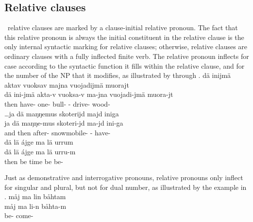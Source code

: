 \subsection{Relative clauses}\label{relativeClauses}
\PS\ relative clauses are marked by a clause-initial relative pronoun. The fact that this relative pronoun  
is always the initial constituent in the relative clause is the only internal syntactic marking for relative clauses; otherwise, relative clauses are ordinary clauses with a fully inflected finite verb. %
The relative pronoun %
inflects for case according to the syntactic function it fills within the relative clause, and for the number of the NP that it modifies, as illustrated by  through .
\ea\label{relClause1}%
\glll	dä inijmä aktav vuoksav majna vuojadijmä muorajt\\
	dä ini-jmä akta-v vuoksa-v ma-jna vuojadi-jmä muora-jt\\
	then have- one- bull- - drive- wood-\\\nopagebreak
{} 
\z
\ea\label{relClause2}%
\glll	…ja dä maŋŋemus skoterijd majd iniga\\
	ja dä maŋŋe-mus skoteri-jd ma-jd ini-ga\\
	and then after- snowmobile- - have-\\\nopagebreak
{} 
\z
\ea\label{relClause3}%
\glll	dä lä ájge ma lä urrum\\
	dä lä ájge ma lä urru-m \\
	then be\BS{} time\BS{} \BS{} be\BS{} be-\\\nopagebreak
{} 
\z

Just as demonstrative and interrogative pronouns, relative pronouns only inflect for singular and plural, but not for dual number, as illustrated by the example in . 
\ea\label{relClause4}%
\glll	måj ma lin båhtam\\
	måj ma li-n båhta-m\\
	 \BS{} be- come-\\\nopagebreak
{} 
\z

